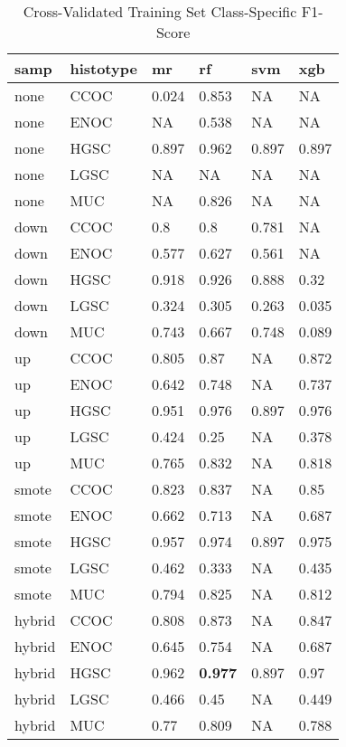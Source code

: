 \documentclass[
]{report}
\begin{document}
\begin{table}

\caption{\label{tab:train-f1-class-table}Cross-Validated Training Set Class-Specific F1-Score}
\centering
\begin{tabular}[t]{l|l|l|l|l|l}
\hline
samp & histotype & mr & rf & svm & xgb\\
\hline
none & CCOC & 0.024 & 0.853 & NA & NA\\
\hline
none & ENOC & NA & 0.538 & NA & NA\\
\hline
none & HGSC & 0.897 & 0.962 & 0.897 & 0.897\\
\hline
none & LGSC & NA & NA & NA & NA\\
\hline
none & MUC & NA & 0.826 & NA & NA\\
\hline
down & CCOC & 0.8 & 0.8 & 0.781 & NA\\
\hline
down & ENOC & 0.577 & 0.627 & 0.561 & NA\\
\hline
down & HGSC & 0.918 & 0.926 & 0.888 & 0.32\\
\hline
down & LGSC & 0.324 & 0.305 & 0.263 & 0.035\\
\hline
down & MUC & 0.743 & 0.667 & 0.748 & 0.089\\
\hline
up & CCOC & 0.805 & 0.87 & NA & 0.872\\
\hline
up & ENOC & 0.642 & 0.748 & NA & 0.737\\
\hline
up & HGSC & 0.951 & 0.976 & 0.897 & 0.976\\
\hline
up & LGSC & 0.424 & 0.25 & NA & 0.378\\
\hline
up & MUC & 0.765 & 0.832 & NA & 0.818\\
\hline
smote & CCOC & 0.823 & 0.837 & NA & 0.85\\
\hline
smote & ENOC & 0.662 & 0.713 & NA & 0.687\\
\hline
smote & HGSC & 0.957 & 0.974 & 0.897 & 0.975\\
\hline
smote & LGSC & 0.462 & 0.333 & NA & 0.435\\
\hline
smote & MUC & 0.794 & 0.825 & NA & 0.812\\
\hline
hybrid & CCOC & 0.808 & 0.873 & NA & 0.847\\
\hline
hybrid & ENOC & 0.645 & 0.754 & NA & 0.687\\
\hline
hybrid & HGSC & 0.962 & \textbf{0.977} & 0.897 & 0.97\\
\hline
hybrid & LGSC & 0.466 & 0.45 & NA & 0.449\\
\hline
hybrid & MUC & 0.77 & 0.809 & NA & 0.788\\
\hline
\end{tabular}
\end{table}
\end{document}
